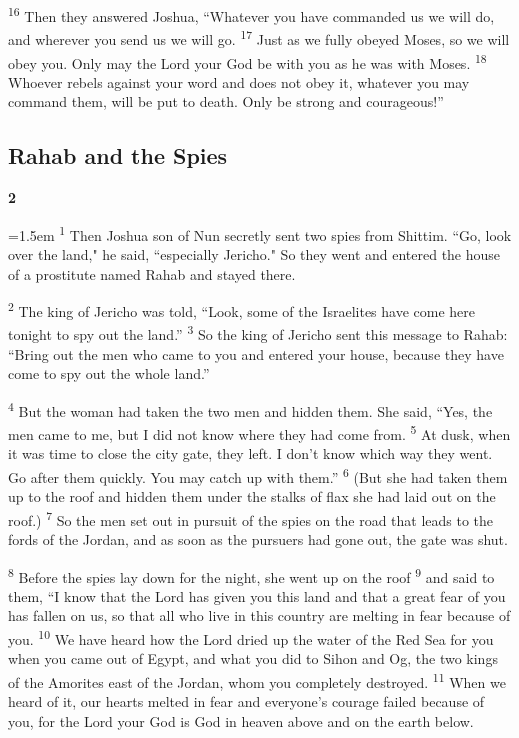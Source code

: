 \documentclass[12pt,twoside]{article}
\newcommand{\vs}[1]{\textsuperscript{#1}}
\newcommand{\chapterWithIndent}[2]{%
  \noindent
  \begin{minipage}[t]{1cm}
    \vspace{-0.4\baselineskip}
    {\fontsize{40pt}{48pt}\selectfont \textbf{#1}}
  \end{minipage}%
  \hspace{0.3cm}%
  \begin{minipage}[t]{\dimexpr\linewidth - 1.5cm - 0.3cm\relax}
    \hangindent=1.5em
    \hangafter=3
    #2
    \vspace{0.1cm}
  \end{minipage}
}
\begin{document}
\vs{16} Then they answered Joshua, ``Whatever you have commanded us we will do, and wherever you send us we will go.
\vs{17} Just as we fully obeyed Moses, so we will obey you. Only may the Lord your God be with you as he was with Moses.
\vs{18} Whoever rebels against your word and does not obey it, whatever you may command them, will be put to death. Only be strong and courageous!''

\subsection*{\textbf{Rahab and the Spies}}

\chapterWithIndent{2}{%
  \vs{1} Then Joshua son of Nun secretly sent two spies from Shittim. ``Go, look over the land," he said, ``especially Jericho." So they went and entered the house of a prostitute named Rahab and stayed there.
}



\vs{2} The king of Jericho was told, ``Look, some of the Israelites have come here tonight to spy out the land.''
\vs{3} So the king of Jericho sent this message to Rahab: ``Bring out the men who came to you and entered your house, because they have come to spy out the whole land.''

\vs{4} But the woman had taken the two men and hidden them. She said, ``Yes, the men came to me, but I did not know where they had come from.
\vs{5} At dusk, when it was time to close the city gate, they left. I don't know which way they went. Go after them quickly. You may catch up with them.''
\vs{6} (But she had taken them up to the roof and hidden them under the stalks of flax she had laid out on the roof.)
\vs{7} So the men set out in pursuit of the spies on the road that leads to the fords of the Jordan, and as soon as the pursuers had gone out, the gate was shut.

\vs{8} Before the spies lay down for the night, she went up on the roof
\vs{9} and said to them, ``I know that the Lord has given you this land and that a great fear of you has fallen on us, so that all who live in this country are melting in fear because of you.
\vs{10} We have heard how the Lord dried up the water of the Red Sea for you when you came out of Egypt, and what you did to Sihon and Og, the two kings of the Amorites east of the Jordan, whom you completely destroyed.
\vs{11} When we heard of it, our hearts melted in fear and everyone's courage failed because of you, for the Lord your God is God in heaven above and on the earth below.
\end{document}
